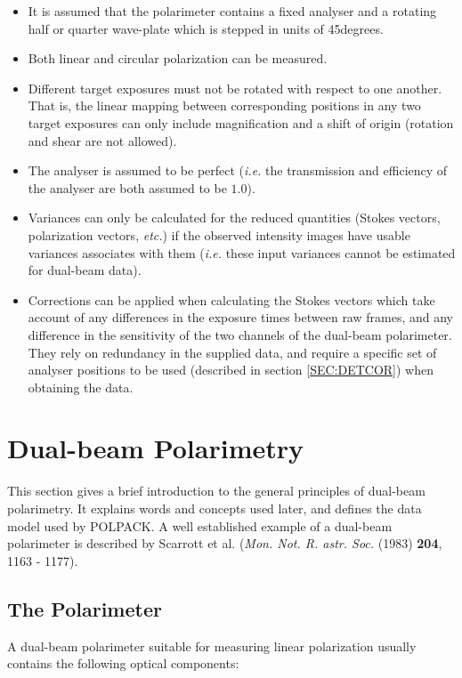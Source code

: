 \documentclass[twoside,11pt]{article}
\newcommand{\hyperref}[4]{#2\ref{#4}#3}
\newcommand{\xlabel}[1]{}
\renewcommand{\_}{\texttt{\symbol{95}}}
\newcommand{\dgs}{\hbox{$^\circ$}}
\renewcommand{\dgs}{degrees}
\begin{document}
\begin{itemize}

\item It is assumed that the polarimeter contains a fixed analyser and a
rotating half or quarter wave-plate which is stepped in units of 45\dgs. 

\item Both linear and circular polarization can be measured. 

\item Different target exposures must not be rotated with respect to one
another. That is, the linear mapping between corresponding positions in any two target 
exposures can only include magnification and a shift of origin (rotation 
and shear are not allowed).

\item The analyser is assumed to be perfect (\emph{i.e.} the transmission and
efficiency of the analyser are both assumed to be $1.0$).

\item Variances can only be calculated for the reduced quantities (Stokes
vectors, polarization vectors, \emph{etc.}) if the observed intensity
images have usable variances associates with them (\emph{i.e.} these
input variances cannot be estimated for dual-beam data).

\item Corrections can be applied when calculating the Stokes vectors which
take account of any differences in the exposure times between raw frames,
and any difference in the sensitivity of the two channels of the
dual-beam polarimeter. They rely on redundancy in the supplied data, and
require a specific set of analyser positions to be used (described
\hyperref{here}{in section }{} {SEC:DETCOR}) when obtaining the data.

\end{itemize}

\section{\label{SEC:DBPOL}\xlabel{dualbeampolarimetry}Dual-beam Polarimetry}
This section gives a brief introduction to the general principles of
dual-beam polarimetry. It explains words and concepts used later, and
defines the data model used by POLPACK. A well established example of a
dual-beam polarimeter is described by Scarrott et al. (\emph{Mon. Not. R.
astr. Soc.} (1983) \textbf{204}, 1163 - 1177).

\subsection{The Polarimeter}
A dual-beam polarimeter suitable for measuring linear polarization usually 
contains the following optical components:
\end{document}
